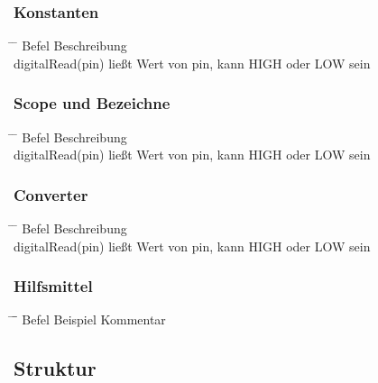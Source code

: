 \documentclass[10pt,a4paper,oneside]{article}
\begin{document}
\subsubsection{Konstanten}
\begin{tabbing}
  \hspace*{1mm} \=\hspace{50mm} \= \kill
  \>Befel \>Beschreibung \\
  \>digitalRead(pin) \> ließt Wert von pin, kann HIGH oder LOW sein \\
\end{tabbing}


\subsubsection{Scope und Bezeichne}
\begin{tabbing}
  \hspace*{1mm} \=\hspace{50mm} \= \kill
  \>Befel \>Beschreibung \\
  \>digitalRead(pin) \> ließt Wert von pin, kann HIGH oder LOW sein \\
\end{tabbing}


\subsubsection{Converter}
\begin{tabbing}
  \hspace*{1mm} \=\hspace{50mm} \= \kill
  \>Befel \>Beschreibung \\
  \>digitalRead(pin) \> ließt Wert von pin, kann HIGH oder LOW sein \\
\end{tabbing}


\subsubsection{Hilfsmittel}
\begin{tabbing}
  \hspace*{1mm} \=\hspace{30mm} \=\hspace{60mm}\= \kill
  \>Befel \>Beispiel \> Kommentar \\
\end{tabbing}


\subsection{Struktur}
\end{document}
